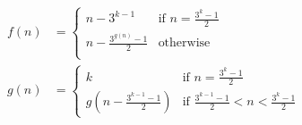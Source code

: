 \documentclass{article}
\begin{document}
\thispagestyle{empty}

\begin{align*}
  f(n) &= \begin{cases}
    n - 3^{k - 1} &\mbox{if } n = \frac{3^k - 1}{2} \\
    n - \frac{3^{g(n)} - 1}{2} & \mbox{otherwise}\\
  \end{cases}\\
  g(n) &= \begin{cases}
    k &\mbox{if } n = \frac{3^k - 1}{2} \\
    g(n - \frac{3^{k - 1} - 1}{2}) & \mbox{if } \frac{3^{k - 1} - 1}{2} < n < \frac{3^k - 1}{2}
  \end{cases}\\
\end{align*}
\end{document}
